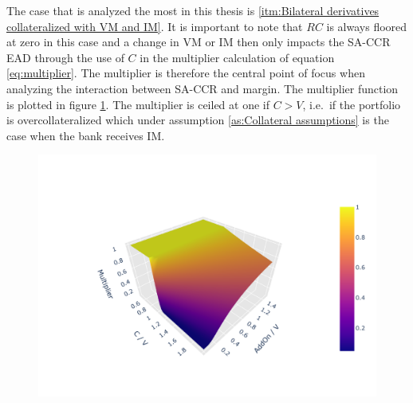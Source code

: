 \documentclass[../Thesis_AHoecherl.tex]{subfiles}
\begin{document}
The case that is analyzed the most in this thesis is \ref{itm:Bilateral derivatives collateralized with VM and IM}. It is important to note that \(RC\) is always floored at zero in this case and a change in VM or IM then only impacts the \gls{SA-CCR} \gls{EAD} through the use of \(C\) in the multiplier calculation of equation \ref{eq:multiplier}.
The multiplier is therefore the central point of focus when analyzing the interaction between SA-CCR and margin. The multiplier function is plotted in figure \ref{fig:multiplier}.
The multiplier is ceiled at one if \(C>V\), i.e.~if the portfolio is overcollateralized which under assumption \ref{as:Collateral assumptions} is the case when the bank receives \gls{IM}.


% 

\begin{figure}
	\centering
	\includegraphics[scale=0.9]{Graphics/SACCR_Multiplier_Function.pdf}
	\caption{}
	\label{fig:multiplier}
\end{figure}

% 

% 
\end{document}
